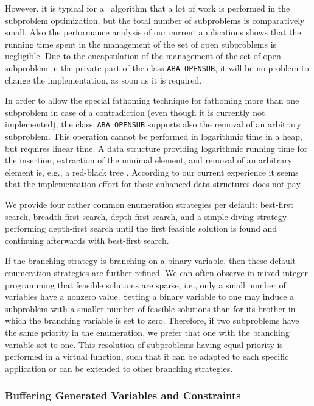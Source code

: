However, it is typical for a \lpbab\ algorithm that a lot of work
is performed in the subproblem optimization, but the total number
of subproblems is comparatively small. Also the performance analysis
of our current applications shows that the running time spent
in the management of the set of open subproblems is negligible.
Due to the encapsulation of the management of the set of open
subproblem in the private part of the class {\tt ABA\_OPENSUB}, it
will be no problem to change the implementation, as soon as it is
required.

In order to allow the special fathoming technique for fathoming more than one
subproblem in case of a contradiction (even though it
is currently not implemented), the class~{\tt ABA\_OPENSUB} supports
also the removal of an arbitrary subproblem. This operation
cannot be performed in logarithmic time in a heap, but requires
linear time. A data structure providing logarithmic running time
for the insertion, extraction of the minimal element,
and removal of an arbitrary element is, e.g., a red-black tree
\cite{Bay72, GS78}.
According to our current experience it seems that the implementation
effort for these enhanced data structures does not pay.

We provide four rather common 
enumeration strategies per
default: best-first search, breadth-first search, depth-first search,
and a simple diving strategy performing depth-first search until the
first feasible solution is found and continuing afterwards with
best-first search. 

If the branching strategy is branching on a binary
variable, then these default enumeration strategies are further refined.
We can often observe in mixed integer programming that feasible solutions
are sparse, i.e., only a small number of variables have a nonzero value.
Setting a binary variable to one may induce a subproblem
with a smaller number of feasible solutions than for its brother in which
the branching variable is set to zero. Therefore, if two subproblems have the
same priority in the enumeration, we prefer that one with the branching
variable set to one. This resolution of subproblems having equal priority
is performed in a virtual function, such that it can be adapted to 
each specific application or can be extended to other branching strategies.

\subsubsection{Buffering Generated Variables and Constraints}\nobreak
{}

